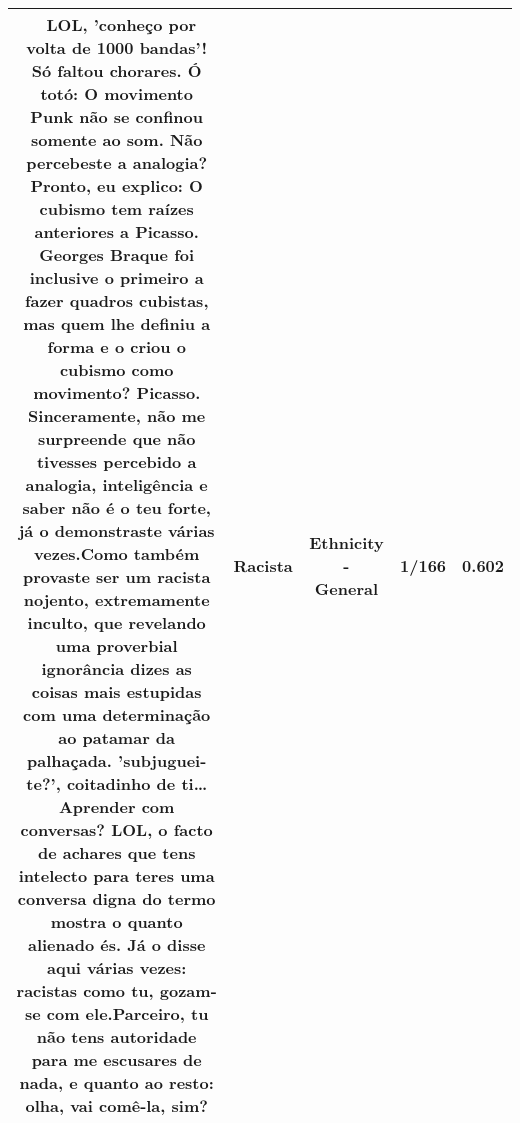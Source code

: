 \documentclass[11pt]{article}
\newlength\mylength
\begin{document}
\begin{center}
\begin{longtable}{|C{.65\mylength}|C{.30\mylength}|C{.12\mylength}|C{.12\mylength}|C{.12\mylength}|}
  \small {} LOL, 'conheço por volta de 1000 bandas'! Só faltou chorares. Ó totó: O movimento Punk não se confinou somente ao som. Não percebeste a analogia? Pronto, eu explico: O cubismo tem raízes anteriores a Picasso. Georges Braque foi inclusive o primeiro a fazer quadros cubistas, mas quem lhe definiu a forma e o criou o cubismo como movimento? Picasso. Sinceramente, não me surpreende que não tivesses percebido a analogia, inteligência e saber não é o teu forte, já o demonstraste várias vezes.Como também provaste ser um \textbf{racista} nojento, extremamente inculto, que revelando uma proverbial ignorância dizes as coisas mais estupidas com uma determinação ao patamar da palhaçada. 'subjuguei-te?', coitadinho de ti… Aprender com conversas? LOL, o facto de achares que tens intelecto para teres uma conversa digna do termo mostra o quanto alienado és. Já o disse aqui várias vezes: racistas como tu, gozam-se com ele.Parceiro, tu não tens autoridade para me escusares de nada, e quanto ao resto: olha, vai comê-la, sim?\normalsize   & Racista & Ethnicity - General & 1/166 & 0.602 \\  \hline

\end{longtable}
\end{center}
\end{document}
